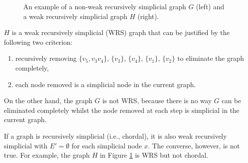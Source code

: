 \begin{example}
\begin{figure}[H]
\centering
{}
\caption{An example of a non-weak recursively simplicial graph $G$ (left) and a weak recursively simplicial graph $H$ (right).}
\label{fg:wrs}
\end{figure}

$H$ is a weak recursively simplicial (WRS) graph that can be justified by the following two criterion:
\begin{enumerate}
\item recursively removing $\{v_5, v_3v_4\}$, $\{v_3\}$, $\{v_4\}$, $\{v_1\}$, $\{v_2\}$ to eliminate the graph completely,
\item each node removed is a simplicial node in the current graph.
\end{enumerate}
On the other hand, the graph $G$ is not WRS, because there is no way $G$ can be eliminated completely whilst the node removed at each step is simplicial in the current graph. 
\end{example}

If a graph is recursively simplicial (i.e., chordal), it is also weak recursively simplicial with $E'=\emptyset$ for each simplicial node $x$. The converse, however, is not true. For example, the graph $H$ in Figure \ref{fg:wrs} is WRS but not chordal. 

